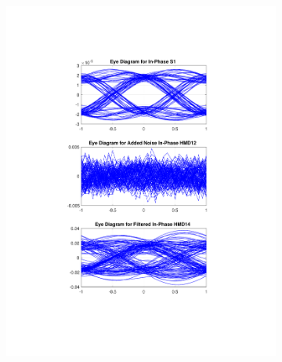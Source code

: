 \begin{figure}[H]
	\centering
		\begin{subfigure}{.45\textwidth}
		\centering
		\includegraphics[clip, trim=5cm 4cm 5cm 4cm, width=\textwidth]{./sdf/m_qam_system/figures/eyes/if_p_60_03.pdf}
	\end{subfigure}
	\begin{subfigure}{.45\textwidth}
		\centering

\end{subfigure}
\end{figure}
